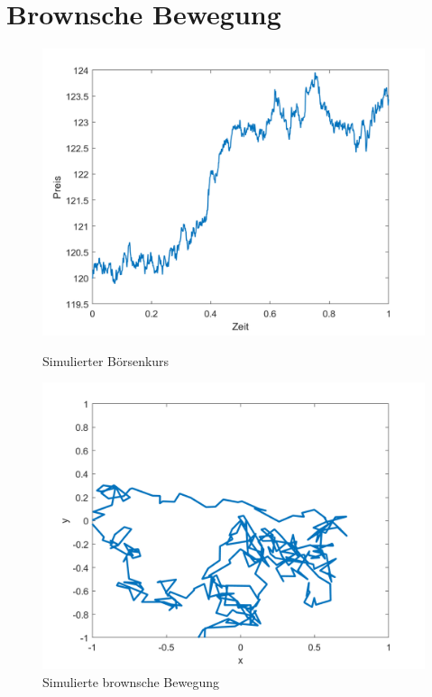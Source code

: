 %
%
%
%

\section{Brownsche Bewegung\label{brown:BrownBewegung}}

\begin{figure}
	\centering
	\begin{minipage}{0.45\textwidth}
		\centering
		\includegraphics[width=\linewidth]{papers/brown/images/simulierter-boersenkurs.png}
		\caption{Simulierter Börsenkurs}
		\label{brown:1Dbrownian}
	\end{minipage}
	\hspace{0.05\linewidth}
	\begin{minipage}{0.45\textwidth}
		\centering
		\includegraphics[width=\linewidth]{papers/brown/images/simulierte-bronsche-bewegung.png}
		\caption{Simulierte brownsche Bewegung}
		\label{brown:2Dbrownian}
	\end{minipage}
\end{figure}

